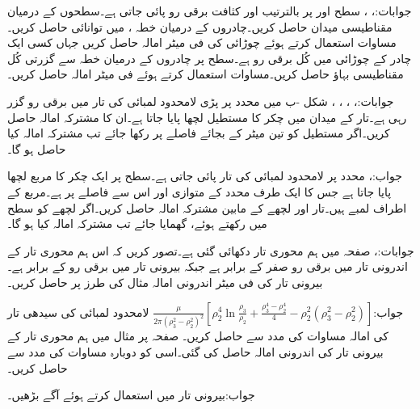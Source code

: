 جوابات:، ، 
سطح  اور  پر بالترتیب  اور  کثافت برقی رو پائی جاتی ہے۔سطحوں کے درمیان مقناطیسی میدان  حاصل کریں۔چادروں کے درمیان خطہ ،  میں توانائی  حاصل کریں۔ مساوات  استعمال کرتے ہوئے  چوڑائی کی فی میٹر امالہ حاصل کریں جہاں  کسی ایک چادر کے  چوڑائی میں کُل برقی رو ہے۔سطح  پر چادروں کے درمیان خطہ  سے گزرتی کُل مقناطیسی بہاؤ  حاصل کریں۔مساوات  استعمال کرتے ہوئے فی میٹر امالہ حاصل کریں۔

جوابات:، ، ، ، 
شکل -ب میں  محدد پر پڑی لامحدود لمبائی کی تار میں برقی رو  گزر رہی ہے۔تار کے میدان میں  چکر کا مستطیل لچھا پایا جاتا ہے۔ان کا مشترکہ امالہ حاصل کریں۔اگر مستطیل کو تین میٹر کے بجائے  فاصلے پر رکھا جائے تب مشترکہ امالہ کیا حاصل ہو گا۔

جواب:، 
محدد  پر لامحدود لمبائی کی تار پائی جاتی ہے۔سطح  پر ایک چکر کا مربع لچھا پایا جاتا ہے جس کا ایک طرف  محدد کے متوازی اور اس سے  فاصلے پر ہے۔مربع کے اطراف  لمبے ہیں۔تار اور لچھے کے مابین مشترکہ امالہ  حاصل کریں۔اگر لچھے کو  سطح میں رکھتے ہوئے،  گھمایا جائے تب مشترکہ امالہ کیا ہو گا۔

جوابات:، 
صفحہ  میں ہم محوری تار دکھائی گئی ہے۔تصور کریں کہ اس ہم محوری تار کے اندرونی تار میں برقی رو صفر کے برابر ہے جبکہ بیرونی تار میں برقی رو  کے برابر ہے۔بیرونی تار کی فی میٹر اندرونی امالہ مثال  کی طرز پر حاصل کریں۔ 

جواب:$\frac{\mu}{2\pi \left(\rho_3^2-\rho_2^2 \right)^2} \left[\rho_2^4 \ln \frac{\rho_3}{\rho_2}+\frac{\rho_3^4-\rho_2^4}{4}-\rho_2^2 \left(\rho_3^2-\rho_2^2\right) \right]$
لامحدود لمبائی کی سیدھی تار کی امالہ مساوات  کی مدد سے حاصل کریں۔
صفحہ  پر مثال  میں ہم محوری تار کے بیرونی تار کی اندرونی امالہ حاصل کی گئی۔اسی کو دوبارہ مساوات  کی مدد سے حاصل کریں۔

جواب:بیرونی تار میں  استعمال کرتے ہوئے آگے بڑھیں۔
